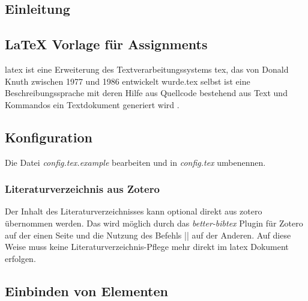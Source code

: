 \documentclass[
   draft=false,
   paper=a4,
   paper=portrait,
   pagesize=auto,
   fontsize=12pt,
   version=last,
   ngerman,
   parskip,
   numbers=noenddot,
   bibliography=totoc,
   listof=totoc
]{scrreprt}
\begin{document}



\begin{spacing}{1.0} %

\tableofcontents
\printglossary[type=\acronymtype]
\printglossary[toctitle=Glossar]
\listoflistings

\end{spacing} 
\clearpage

\setcounter{romanPagenumber}{\value{page}} %


\begin{spacing}{1.5}

\chapter{Einleitung}
\section{LaTeX Vorlage für Assignments}
\gls{latex} ist eine Erweiterung des Textverarbeitungssystems \gls{tex}, das von Donald Knuth zwischen 1977 und 1986 entwickelt wurde.\gls{tex} selbst ist eine Beschreibungssprache mit deren Hilfe aus Quellcode bestehend aus Text und Kommandos ein Textdokument generiert wird \autocite{ochsnerTextverarbeitungssystemLaTeX2015}.

\section{Konfiguration}
Die Datei \textit{config.tex.example} bearbeiten und in \textit{config.tex} umbenennen.

\subsection{Literaturverzeichnis aus Zotero}
Der Inhalt des Literaturverzeichnisses kann optional direkt aus \gls{zotero} übernommen werden. Das wird möglich durch das \textit{\gls{better-bibtex}} Plugin für Zotero auf der einen Seite und die Nutzung des Befehls \texinline|| auf der Anderen. Auf diese Weise muss keine Literaturverzeichnis-Pflege mehr direkt im \gls{latex} Dokument erfolgen.

\section{Einbinden von Elementen}

\end{spacing}
\end{document}

